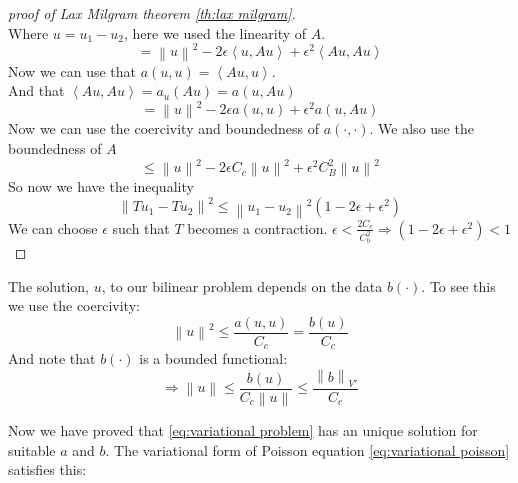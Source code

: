 \documentclass[../Main/main.tex]{subfiles}
\begin{document}
\begin{proof}[proof of Lax Milgram theorem \ref{th:lax milgram}]
\begin{equation*}
		\end{equation*}
		Where $u = u_1 - u_2$, here we used the linearity of $A$.
		\begin{equation*}
			=\left \| u \right \|^2 - 2 \epsilon \left \langle u,Au \right \rangle + \epsilon^2 \left \langle Au,Au \right\rangle
		\end{equation*}
		Now we can use that $a(u,u)=\left \langle Au,u \right \rangle$.\\
		And that $\left \langle Au,Au \right \rangle = a_u(Au) = a(u,Au)$ 
		\begin{equation*}
			=\left \| u \right \|^2 - 2\epsilon a(u,u) + \epsilon^2 a(u,Au)
		\end{equation*}
		Now we can use the coercivity and boundedness of $a(\cdot,\cdot)$. We also use the boundedness of $A$
		\begin{equation*}
			\leq \left \|u  \right \|^2 -2\epsilon C_c \left \| u \right \|^2 + \epsilon^2 C_B^2 \left \|u  \right \|^2
		\end{equation*}
		So now we have the inequality
		\begin{equation*}
			\left \| Tu_1 -Tu_2 \right \|^2 \leq \left \| u_1 - u_2 \right \|^2 (1-2\epsilon + \epsilon^2)
		\end{equation*}
		We can choose $\epsilon$ such that $T$ becomes a contraction.
		$\epsilon < \frac{2 C_c}{C_b^2} \Rightarrow (1-2\epsilon + \epsilon^2)<1$
	\end{proof}
	\begin{remark}\label{rm:stability}
		The solution, $u$, to our bilinear problem depends on the data $b(\cdot)$. To see this we use the coercivity:
		\begin{equation*}
			\left \| u \right \|^2 \leq \frac{a(u,u)}{C_c} = \frac{b(u)}{C_c}
		\end{equation*}
		And note that $b(\cdot)$ is a bounded functional:
		\begin{equation*}
			\Rightarrow \left \| u \right \| \leq \frac{b(u)}{C_c \left \|u\right \|} \leq \frac{\left \| b \right \|_{V'}}{C_c}
		\end{equation*}
	\end{remark}
	Now we have proved that \eqref{eq:variational problem} has an unique solution for suitable $a$ and $b$. The variational form of Poisson equation \eqref{eq:variational poisson} satisfies this:
\end{document}
